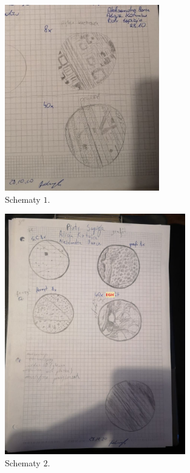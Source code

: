 \begin{figure}[H]
    \centering
    \includegraphics[width=0.6\textwidth]{img/schemat1.jpg}
    \caption{Schematy $1$.}
\end{figure}

\begin{figure}[H]
    \centering
    \includegraphics[width=0.7\textwidth]{img/schemat2.jpg}
    \caption{Schematy $2$.}
\end{figure}

